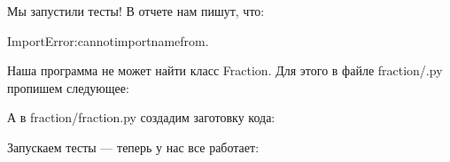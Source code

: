 \documentclass[letterpaper,10pt,russian]{sphinxmanual}
\begin{document}
\sphinxAtStartPar
Мы запустили тесты! В отчете нам пишут, что:

\begin{sphinxVerbatim}[commandchars=\\\{\}]
ImportError:cannotimportnamefrom.
\end{sphinxVerbatim}

\sphinxAtStartPar
Наша программа не может найти класс Fraction. Для этого в файле fraction/.py пропишем следующее:

\begin{sphinxVerbatim}[commandchars=\\\{\}]
   
\end{sphinxVerbatim}

\sphinxAtStartPar
А в fraction/fraction.py создадим заготовку кода:

\begin{sphinxVerbatim}[commandchars=\\\{\}]
 
      
         
         

\end{sphinxVerbatim}

\sphinxAtStartPar
Запускаем тесты — теперь у нас все работает:
\end{document}
